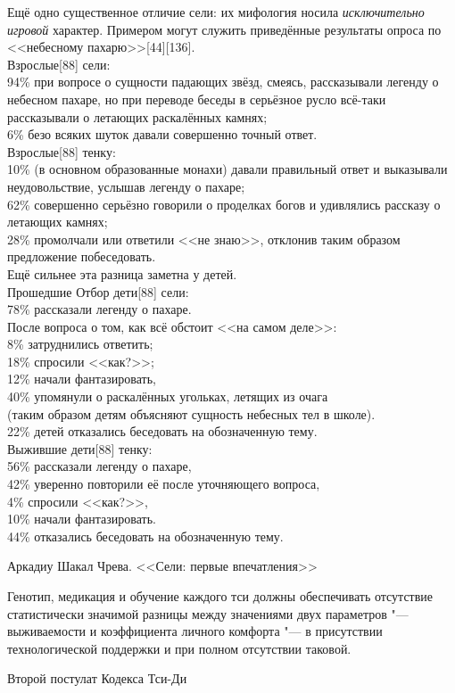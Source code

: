 \epigraph
{Ещё одно существенное отличие сели: их мифология носила \emph{исключительно игровой} характер.
Примером могут служить приведённые результаты опроса по <<небесному пахарю>>[44][136].\\
Взрослые[88] сели:\\
94\% при вопросе о сущности падающих звёзд, смеясь, рассказывали легенду о небесном пахаре, но при переводе беседы в серьёзное русло всё-таки рассказывали о летающих раскалённых камнях;\\
6\% безо всяких шуток давали совершенно точный ответ.\\
Взрослые[88] тенку:\\
10\% (в основном образованные монахи) давали правильный ответ и выказывали неудовольствие, услышав легенду о пахаре;\\
62\% совершенно серьёзно говорили о проделках богов и удивлялись рассказу о летающих камнях;\\
28\% промолчали или ответили <<не знаю>>, отклонив таким образом предложение побеседовать.\\
Ещё сильнее эта разница заметна у детей.\\
Прошедшие Отбор дети[88] сели:\\
78\% рассказали легенду о пахаре.\\
После вопроса о том, как всё обстоит <<на самом деле>>:\\
8\% затруднились ответить;\\
18\% спросили <<как?>>;\\
12\% начали фантазировать,\\
40\% упомянули о раскалённых угольках, летящих из очага\\
(таким образом детям объясняют сущность небесных тел в школе).\\
22\% детей отказались беседовать на обозначенную тему.\\
Выжившие дети[88] тенку:\\
56\% рассказали легенду о пахаре,\\
42\% уверенно повторили её после уточняющего вопроса,\\
4\% спросили <<как?>>,\\
10\% начали фантазировать.\\
44\% отказались беседовать на обозначенную тему.}
{Аркадиу Шакал Чрева.
<<Сели: первые впечатления>>}

\epigraph
{Генотип, медикация и обучение каждого тси должны обеспечивать отсутствие статистически значимой разницы между значениями двух параметров "--- выживаемости и коэффициента личного комфорта\footnotemark{} "--- в присутствии технологической поддержки и при полном отсутствии таковой.}
{Второй постулат Кодекса Тси-Ди}

